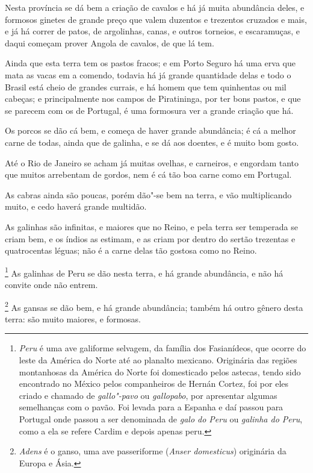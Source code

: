\begin{linenumbers}
 Nesta província se dá bem a criação de cavalos e há
já muita abundância deles, e formosos ginetes de grande preço que valem
duzentos e trezentos cruzados e mais, e já há correr de patos, de
argolinhas, canas, e outros torneios, e escaramuças, e daqui começam
prover Angola de cavalos, de que lá tem.

 Ainda que esta terra tem os pastos fracos; e em Porto
Seguro há uma erva que mata as vacas em a comendo, todavia há já grande
quantidade delas e todo o Brasil está cheio de grandes currais, e há
homem que tem quinhentas ou mil cabeças; e principalmente nos campos de
Piratininga, por ter bons pastos, e que se parecem com os de Portugal,
é uma formosura ver a grande criação que há.

 Os porcos se dão cá bem, e começa de haver grande
abundância; é cá a melhor carne de todas, ainda que de galinha, e se dá
aos doentes, e é muito bom gosto.

 Até o Rio de Janeiro se acham já muitas ovelhas, e
carneiros, e engordam tanto que muitos arrebentam de gordos, nem é cá
tão boa carne como em Portugal.

 As cabras ainda são poucas, porém dão"-se bem na
terra, e vão multiplicando muito, e cedo haverá grande multidão.

 As galinhas são infinitas, e maiores que no Reino,
e pela terra ser temperada se criam bem, e os índios as estimam, e as
criam por dentro do sertão trezentas e quatrocentas léguas; não é a
carne delas tão gostosa como no Reino.

\footnote{ \textit{Peru} é uma ave galiforme selvagem,
da família dos Fasianídeos, que ocorre do leste da América do Norte até
ao planalto mexicano. Originária das regiões montanhosas da América do
Norte foi domesticado pelos astecas, tendo sido encontrado no México
pelos companheiros de Hernán Cortez, foi por eles criado e chamado de
\textit{gallo"-pavo} ou \textit{gallopabo}, por apresentar algumas
semelhanças com o pavão. Foi levada para a Espanha e daí passou para
Portugal onde passou a ser denominada de \textit{galo do Peru} ou
\textit{galinha do Peru}, como a ela se refere Cardim e depois apenas
peru.} As galinhas de Peru se dão nesta terra, e há grande
abundância, e não há convite onde não entrem.

\footnote{ \textit{Adens} é o ganso, uma ave
passeriforme (\textit{Anser domesticus}) originária da Europa e
Ásia.} As gansas se dão bem, e há grande abundância; também
há outro gênero desta terra: são muito maiores, e formosas.


\end{linenumbers}
